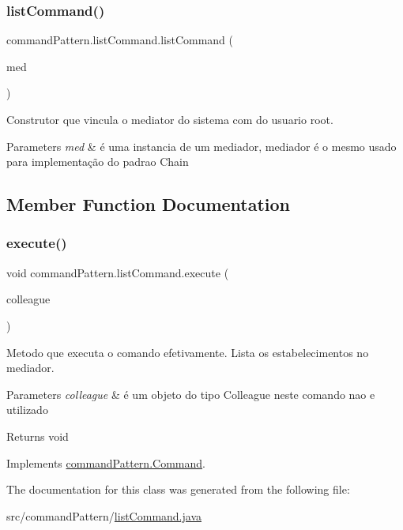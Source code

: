 \subsubsection{\texorpdfstring{listCommand()}{listCommand()}}
{\footnotesize\ttfamily command\+Pattern.\+list\+Command.\+list\+Command (\begin{DoxyParamCaption}\item[{\mbox{\hyperlink{classmediator_pattern_1_1_mediator_message}{Mediator\+Message}}}]{med }\end{DoxyParamCaption})}



Construtor que vincula o mediator do sistema com do usuario root. 


\begin{DoxyParams}{Parameters}
{\em med} & é uma instancia de um mediador, mediador é o mesmo usado para implementação do padrao Chain \\
\hline
\end{DoxyParams}


\subsection{Member Function Documentation}
\mbox{\label{classcommand_pattern_1_1list_command_a07df0f4664e8ac6fa0ecb37ba49f1611}} 
\subsubsection{\texorpdfstring{execute()}{execute()}}
{\footnotesize\ttfamily void command\+Pattern.\+list\+Command.\+execute (\begin{DoxyParamCaption}\item[{\mbox{\hyperlink{classmediator_pattern_1_1_colleague}{Colleague}}}]{colleague }\end{DoxyParamCaption})}



Metodo que executa o comando efetivamente. Lista os estabelecimentos no mediador. 


\begin{DoxyParams}{Parameters}
{\em colleague} & é um objeto do tipo Colleague neste comando nao e utilizado \\
\hline
\end{DoxyParams}
\begin{DoxyReturn}{Returns}
void 
\end{DoxyReturn}


Implements \mbox{\hyperlink{interfacecommand_pattern_1_1_command_a4e6eb0bcffccf0b3934ccd1d5727b39b}{command\+Pattern.\+Command}}.



The documentation for this class was generated from the following file\+:\begin{DoxyCompactItemize}
\item 
src/command\+Pattern/\mbox{\hyperlink{list_command_8java}{list\+Command.\+java}}\end{DoxyCompactItemize}
